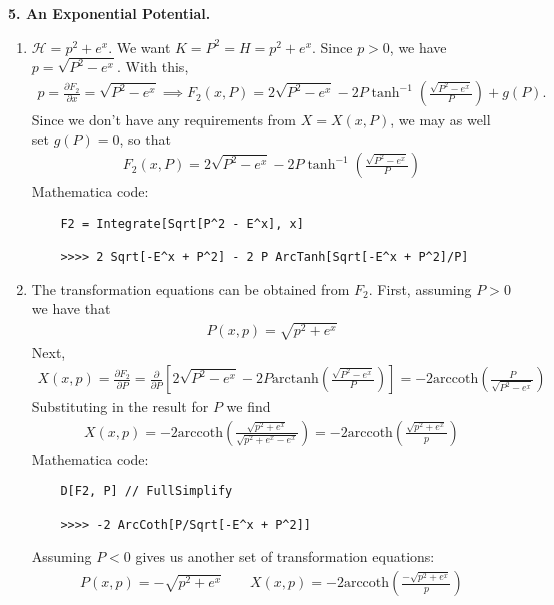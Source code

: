 \documentclass{article}
\theoremstyle{definition}
\newcommand{\p}{\partial}
\newcommand{\ham}{\mathcal{H}}
\newcommand{\f}[2]{\frac{#1}{#2}}
\newcommand{\lp}{\left(}
\newcommand{\rp}{\right)}
\newcommand{\lb}{\left[}
\newcommand{\rb}{\right]}
\begin{document}
\noindent \textbf{5. An Exponential Potential. }
\begin{enumerate}[label=(\alph*)]
	\item $\ham = p^2 + e^x$. We want $K = P^2 = H = p^2 + e^x$. Since $p>0$, we have $p = \sqrt{P^2 - e^x}$. With this, 
	\begin{align*}
	p = \f{\p F_2}{\p x} = \sqrt{P^2 - e^x} \implies F_2(x,P) = 2\sqrt{P^2 - e^x} - 2P \tanh^{-1}\lp \f{\sqrt{P^2- e^x}}{P}\rp + g(P).
	\end{align*} 
	Since we don't have any requirements from $X = X(x,P)$, we may as well set $g(P) = 0$, so that
	\begin{align*}
	\boxed{F_2(x,P) = 2\sqrt{P^2 - e^x} - 2P \tanh^{-1}\lp \f{\sqrt{P^2- e^x}}{P}\rp   } 
	\end{align*}
	Mathematica code:
	\begin{lstlisting}
	F2 = Integrate[Sqrt[P^2 - E^x], x]
	
	>>>> 2 Sqrt[-E^x + P^2] - 2 P ArcTanh[Sqrt[-E^x + P^2]/P]
	\end{lstlisting}
	
	
	
	
	\item The transformation equations can be obtained from $F_2$. First, assuming $P>0$ we have that
	\begin{align*}
	\boxed{P(x,p) = \sqrt{p^2 + e^x}}
	\end{align*}
	Next,
	\begin{align*}
	X(x,p) = \f{\p F_2}{\p P} = \f{\p }{\p P}\lb 2\sqrt{P^2 - e^x} - 2P \text{arctanh}\lp \f{\sqrt{P^2- e^x}}{P}\rp   \rb = -2\text{arccoth}\lp \f{P}{\sqrt{P^2 - e^x}} \rp
	\end{align*} 
	Substituting in the result for $P$ we find 
	\begin{align*}
	\boxed{X(x,p)} = -2\text{arccoth}\lp \f{\sqrt{p^2 +e^x}}{\sqrt{p^2 + e^x - e^x}} \rp =  \boxed{-2\text{arccoth}\lp \f{\sqrt{p^2 +e^x}}{p} \rp}
	\end{align*}
	Mathematica code:
	\begin{lstlisting}
	D[F2, P] // FullSimplify
	
	>>>> -2 ArcCoth[P/Sqrt[-E^x + P^2]]
	\end{lstlisting}
	Assuming $P<0$ gives us another set of transformation equations:
	\begin{align*}
	\boxed{P(x,p) = -\sqrt{p^2 + e^x}} \quad\quad \boxed{X(x,p) =  -2\text{arccoth}\lp \f{-\sqrt{p^2 +e^x}}{p} \rp }
	\end{align*}
	

\end{enumerate}
\end{document}
